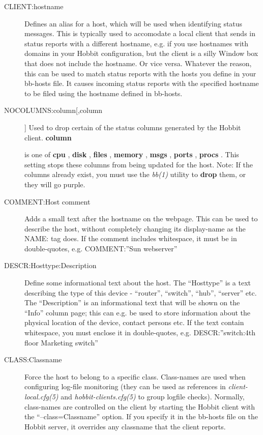 \begin{description}
 

\item[CLIENT:hostname] Defines an alias for a host, which will be used
  when identifying status messages. This is typically used to
  accomodate a local client that sends in status reports with a
  different hostname, e.g. if you use hostnames with domains in your
  Hobbit configuration, but the client is a silly Window box that does
  not include the hostname. Or vice versa. Whatever the reason, this
  can be used to match status reports with the hosts you define in
  your bb-hosts file. It causes incoming status reports with the
  specified hostname to be filed using the hostname defined in
  bb-hosts. 


 

\item[NOCOLUMNS:column[,column]] Used to drop certain of the status
  columns generated by the Hobbit client. \textbf{column}

 is one of \textbf{cpu}
, \textbf{disk}
, \textbf{files}
, \textbf{memory}
, \textbf{msgs}
, \textbf{ports}
, \textbf{procs}
. This setting stops these columns from being updated for the
 host. Note: If the columns already exist, you must use the
 \emph{bb(1)} utility to \textbf{drop} them, or they will go purple. 


 

\item[COMMENT:Host comment] Adds a small text after the hostname on
  the webpage. This can be used to describe the host, without
  completely changing its display-name as the NAME: tag does. If the
  comment includes whitespace, it must be in double-quotes,
  e.g. COMMENT:''Sun webserver'' 


 

\item[DESCR:Hosttype:Description] Define some informational text about
  the host. The ``Hosttype'' is a text describing the type of this
  device - ``router'', ``switch'', ``hub'', ``server'' etc. The
  ``Description'' is an informational text that will be shown on the
  ``Info'' column page; this can e.g. be used to store information
  about the physical location of the device, contact persons etc. If
  the text contain whitespace, you must enclose it in double-quotes,
  e.g. DESCR:''switch:4th floor Marketing switch'' 


 \item[CLASS:Classname] Force the host to belong to a specific
  class. Class-names are used when configuring log-file monitoring
  (they can be used as references in \emph{client-local.cfg(5)} and
  \emph{hobbit-clients.cfg(5)} to group logfile checks). Normally,
  class-names are controlled on the client by starting the Hobbit
  client with the ``--class=Classname'' option. If you specify it in
  the bb-hosts file on the Hobbit server, it overrides any classname
  that the client reports. 



\end{description}
